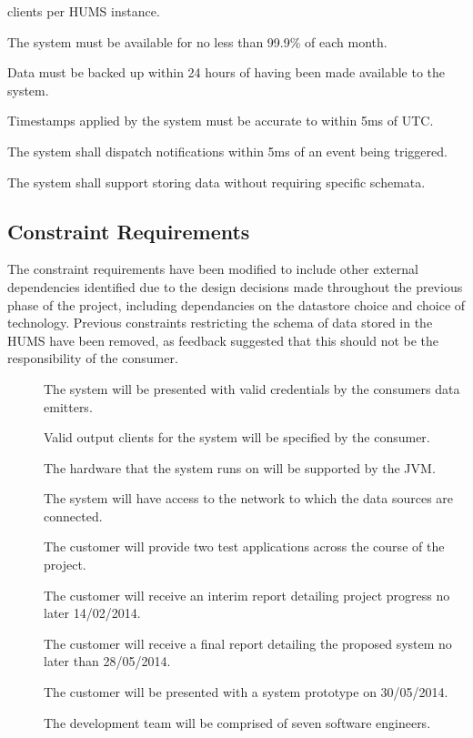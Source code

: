\begin{description}
	clients per HUMS instance. 
	\item[\nfr{9}] The system must be available for no less than 99.9\% of 
	each month.
	\item[\nfr{10}]  Data must be backed up within 24 hours of having been 
	made available to the system.
	 \item[\nfr{11}] Timestamps applied by the system must be accurate to 
	within 5ms of UTC.
	\item[\nfr{12}]  The system shall dispatch notifications within 5ms of an 
	event being triggered.
	\item[\nfr{13}] The system shall support storing data without requiring 
	specific schemata.
\end{description}

\subsection{Constraint Requirements}
The constraint requirements have been modified to include other external dependencies identified due to the design decisions made throughout the previous phase of the project, including dependancies on the datastore choice and choice of technology. Previous constraints restricting the schema of data stored in the HUMS have been removed, as feedback suggested that this should not be the responsibility of the consumer.
\begin{description}
	\item[]  The system will be presented with valid credentials 	by the consumers data emitters.
	\item[]  Valid output clients for the system will be specified 		by the consumer.	
	\item[]  The hardware that the system runs on will be 			supported by the JVM.
	\item[]  The system will have access to the network to which 	the data sources are connected.
	\item[]  The customer will provide two test applications 		across the course of the project.
	\item[]  The customer will receive an interim report detailing 	project progress no later 14/02/2014.
	\item[] The customer will receive a final report detailing the 	proposed system no later than 28/05/2014. 
	\item[]  The customer will be presented with a system 		prototype on 30/05/2014.
	\item[] The development team will be comprised of seven 		software engineers.
\end{description}

